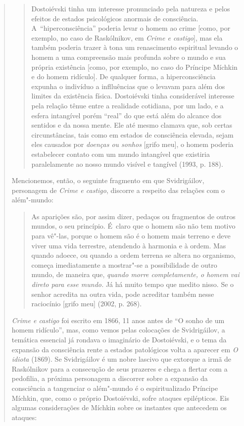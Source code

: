 {\begin{quote}
\begin{quote}
Dostoiévski tinha um interesse pronunciado pela natureza e pelos efeitos
de estados psicológicos anormais de consciência. A~``hiperconsciência''
poderia levar o homem ao crime {[}como, por exemplo, no caso de
Raskólnikov, em \emph{Crime e castigo}{]}, mas ela também poderia trazer
à tona um renascimento espiritual levando o homem a uma compreensão mais
profunda sobre o mundo e sua própria existência {[}como, por exemplo, no
caso do Príncipe Míchkin e do homem ridículo{]}. De qualquer forma, a
hiperconsciência expunha o indivíduo a inflluências que o levavam para
além dos limites da existência física. Dostoiévski tinha considerável
interesse pela relação tênue entre a realidade cotidiana, por um lado, e
a esfera intangível porém ``real'' do que está além do alcance dos
sentidos e da nossa mente. Ele até mesmo clamava que, sob certas
circunstâncias, tais como em estados de consciência elevada, sejam eles
causados por \emph{doenças ou sonhos} {[}grifo meu{]}, o homem poderia
estabelecer contato com um mundo intangível que existiria paralelamente
ao nosso mundo visível e tangível (1993, p. 188).
\end{quote}

Mencionemos, então, o seguinte fragmento em que Svidrigáilov, personagem
de \emph{Crime e castigo}, discorre a respeito das relações com o
além"-mundo:

\begin{quote}
As aparições são, por assim dizer, pedaços ou fragmentos de outros
mundos, o seu princípio. É~claro que o homem são não tem motivo para
vê"-las, porque o homem são é o homem mais terreno e deve viver uma vida
terrestre, atendendo à harmonia e à ordem. Mas quando adoece, ou quando
a ordem terrena se altera no organismo, começa imediatamente a
mostrar"-se a possibilidade de outro mundo, de maneira que, \emph{quando
morre completamente, o homem vai direto para esse mundo.} Já há muito
tempo que medito nisso. Se o senhor acredita na outra vida, pode
acreditar também nesse raciocínio {[}grifo meu{]} (2002, p. 268).
\end{quote}

\emph{Crime e castigo} foi escrito em 1866, 11 anos antes de ``O sonho
de um homem ridículo'', mas, como vemos pelas colocações de
Svidrigáilov, a temática essencial já rondava o imaginário de
Dostoiévski, e o tema da expansão da consciência rente a estados
patológicos volta a aparecer em \emph{O idiota} (1869). Se Svidrigáilov
é um nobre lascivo que extorque a irmã de Raskólnikov para a consecução
de seus prazeres e chega a flertar com a pedofilia, a próxima personagem
a discorrer sobre a expansão da consciência a tangenciar o além"-mundo é
o espiritualizado Príncipe Míchkin, que, como o próprio Dostoiévski,
sofre ataques epilépticos. Eis algumas considerações de Míchkin sobre os
instantes que antecedem os ataques:


\end{quote}}
